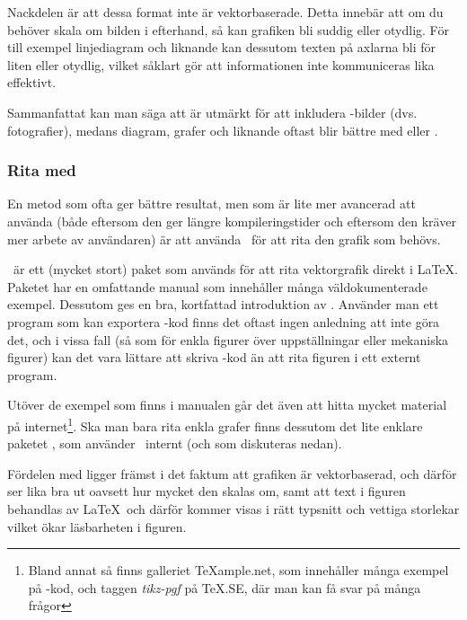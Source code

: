 \documentclass[lang=sv,ptsize=10pt,font=none,nomath,titles=bf,../../a4.tex]{subfiles}
\begin{document}
Nackdelen är att dessa format inte är vektorbaserade. Detta innebär att
om du behöver skala om bilden i efterhand, så kan grafiken bli suddig
eller otydlig. För till exempel linjediagram och liknande kan dessutom
texten på axlarna bli för liten eller otydlig, vilket såklart gör att
informationen inte kommuniceras lika effektivt. 

Sammanfattat kan man säga att  är utmärkt för att
inkludera \JPEG-bilder (dvs. fotografier), medans diagram, grafer och
liknande oftast blir bättre med \PGFTikZ eller .

\subsubsection{Rita med \PGFTikZ}
En metod som ofta ger bättre resultat, men som är lite mer avancerad att
använda (både eftersom den ger längre kompileringstider och eftersom den
kräver mer arbete av användaren) är att använda \PGFTikZ\ för att rita
den grafik som behövs.

\PGFTikZ\ är ett (mycket stort) paket som används för att rita
vektorgrafik direkt i \LaTeX. Paketet har en omfattande manual
\parencite{Tantau10} som innehåller många väldokumenterade exempel.
Dessutom ges en bra, kortfattad introduktion av \textcite{Mertz07}.
Använder man ett program som kan exportera \PGFTikZ-kod finns det oftast
ingen anledning att inte göra det, och i vissa fall (så som för enkla
figurer över uppställningar eller mekaniska figurer) kan det vara 
lättare att skriva \PGFTikZ-kod än att rita figuren i ett externt program.

Utöver de exempel som finns i manualen går det även att hitta mycket
material på internet\footnote{Bland annat så finns galleriet
\TeX{}ample.net, som innehåller 
många exempel på \PGFTikZ-kod, och taggen \emph{tikz-pgf} på
\TeX.SE, 
där man kan få svar på många frågor}. Ska man bara rita enkla grafer
finns dessutom det lite enklare paketet , som använder
\PGFTikZ\ internt (och som diskuteras nedan).%
%

Fördelen med \PGFTikZ ligger främst i det faktum att grafiken är
vektorbaserad, och därför ser lika bra ut oavsett hur mycket den skalas
om, samt att text i figuren behandlas av \LaTeX\ och därför kommer visas
i rätt typsnitt och vettiga storlekar vilket ökar läsbarheten i figuren.
\end{document}
